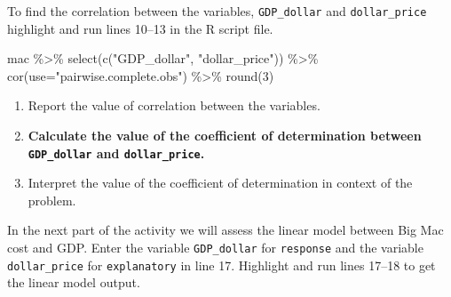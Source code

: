 \documentclass[
]{report}
\newenvironment{Shaded}{\begin{snugshade}}{\end{snugshade}}
\newcommand{\AttributeTok}[1]{\textcolor[rgb]{0.77,0.63,0.00}{#1}}
\newcommand{\CommentTok}[1]{\textcolor[rgb]{0.56,0.35,0.01}{\textit{#1}}}
\newcommand{\DecValTok}[1]{\textcolor[rgb]{0.00,0.00,0.81}{#1}}
\newcommand{\FunctionTok}[1]{\textcolor[rgb]{0.00,0.00,0.00}{#1}}
\newcommand{\NormalTok}[1]{#1}
\newcommand{\OtherTok}[1]{\textcolor[rgb]{0.56,0.35,0.01}{#1}}
\newcommand{\SpecialCharTok}[1]{\textcolor[rgb]{0.00,0.00,0.00}{#1}}
\newcommand{\StringTok}[1]{\textcolor[rgb]{0.31,0.60,0.02}{#1}}
\begin{document}
To find the correlation between the variables, \texttt{GDP\_dollar} and \texttt{dollar\_price} highlight and run lines 10--13 in the R script file.

\begin{Shaded}
\begin{Highlighting}[]
\NormalTok{mac }\SpecialCharTok{\%\textgreater{}\%} 
  \FunctionTok{select}\NormalTok{(}\FunctionTok{c}\NormalTok{(}\StringTok{"GDP\_dollar"}\NormalTok{, }\StringTok{"dollar\_price"}\NormalTok{)) }\SpecialCharTok{\%\textgreater{}\%}
  \FunctionTok{cor}\NormalTok{(}\AttributeTok{use=}\StringTok{"pairwise.complete.obs"}\NormalTok{) }\SpecialCharTok{\%\textgreater{}\%}
  \FunctionTok{round}\NormalTok{(}\DecValTok{3}\NormalTok{)}
\end{Highlighting}
\end{Shaded}

\begin{enumerate}
\def\labelenumi{\arabic{enumi}.}
\item
  Report the value of correlation between the variables.
  \vspace{0.2in}
\item
  \textbf{Calculate the value of the coefficient of determination between \texttt{GDP\_dollar} and \texttt{dollar\_price}.}
  \vspace{0.4in}
\item
  Interpret the value of the coefficient of determination in context of the problem.
  \vspace{0.6in}
\end{enumerate}

In the next part of the activity we will assess the linear model between Big Mac cost and GDP. Enter the variable \texttt{GDP\_dollar} for \texttt{response} and the variable \texttt{dollar\_price} for \texttt{explanatory} in line 17. Highlight and run lines 17--18 to get the linear model output.

\begin{Shaded}
\end{Shaded}
\end{document}

